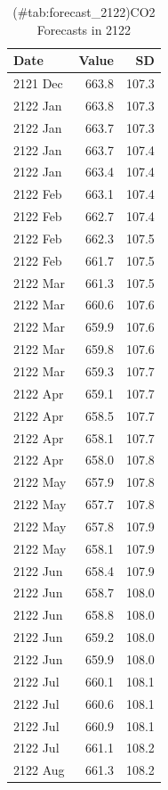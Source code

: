 \documentclass[
]{article}
\begin{document}
\begin{table}[H]
\centering
\caption{(\#tab:forecast_2122)CO2 Forecasts in 2122}
\centering
\fontsize{9}{11}\selectfont
\begin{tabular}[t]{l|r|r}
\hline
Date & Value & SD\\
\hline
2121 Dec & 663.8 & 107.3\\
\hline
2122 Jan & 663.8 & 107.3\\
\hline
2122 Jan & 663.7 & 107.3\\
\hline
2122 Jan & 663.7 & 107.4\\
\hline
2122 Jan & 663.4 & 107.4\\
\hline
2122 Feb & 663.1 & 107.4\\
\hline
2122 Feb & 662.7 & 107.4\\
\hline
2122 Feb & 662.3 & 107.5\\
\hline
2122 Feb & 661.7 & 107.5\\
\hline
2122 Mar & 661.3 & 107.5\\
\hline
2122 Mar & 660.6 & 107.6\\
\hline
2122 Mar & 659.9 & 107.6\\
\hline
2122 Mar & 659.8 & 107.6\\
\hline
2122 Mar & 659.3 & 107.7\\
\hline
2122 Apr & 659.1 & 107.7\\
\hline
2122 Apr & 658.5 & 107.7\\
\hline
2122 Apr & 658.1 & 107.7\\
\hline
2122 Apr & 658.0 & 107.8\\
\hline
2122 May & 657.9 & 107.8\\
\hline
2122 May & 657.7 & 107.8\\
\hline
2122 May & 657.8 & 107.9\\
\hline
2122 May & 658.1 & 107.9\\
\hline
2122 Jun & 658.4 & 107.9\\
\hline
2122 Jun & 658.7 & 108.0\\
\hline
2122 Jun & 658.8 & 108.0\\
\hline
2122 Jun & 659.2 & 108.0\\
\hline
2122 Jun & 659.9 & 108.0\\
\hline
2122 Jul & 660.1 & 108.1\\
\hline
2122 Jul & 660.6 & 108.1\\
\hline
2122 Jul & 660.9 & 108.1\\
\hline
2122 Jul & 661.1 & 108.2\\
\hline
2122 Aug & 661.3 & 108.2\\

\end{tabular}
\end{table}
\end{document}
